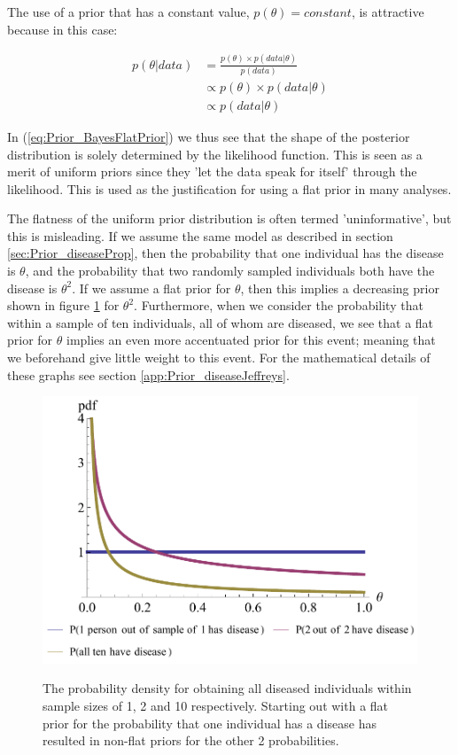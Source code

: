 \documentclass[11pt,fullpage]{book}
\begin{document}
The use of a prior that has a constant value, $p(\theta)=constant$, is attractive because in this case:

\begin{align}\label{eq:Prior_BayesFlatPrior}
p(\theta|data) &= \frac{p(\theta)\times p(data|\theta)}{p(data)}\\
& \propto p(\theta)\times p(data|\theta)\\
& \propto p(data|\theta)
\end{align}

In (\ref{eq:Prior_BayesFlatPrior}) we thus see that the shape of the posterior distribution is solely determined by the likelihood function. This is seen as a merit of uniform priors since they 'let the data speak for itself' through the likelihood. This is used as the justification for using a flat prior in many analyses.

The flatness of the uniform prior distribution is often termed 'uninformative', but this is misleading. If we assume the same model as described in section \ref{sec:Prior_diseaseProp}, then the probability that one individual has the disease is $\theta$, and the probability that two randomly sampled individuals both have the disease is $\theta^2$. If we assume a flat prior for $\theta$, then this implies a decreasing prior shown in figure \ref{fig:Prior_jeffreysIntro} for $\theta^2$. Furthermore, when we consider the probability that within a sample of ten individuals, all of whom are diseased, we see that a flat prior for $\theta$ implies an even more accentuated prior for this event; meaning that we beforehand give little weight to this event. For the mathematical details of these graphs see section \ref{app:Prior_diseaseJeffreys}.

\begin{figure}
\centering
\scalebox{0.75} 
{\includegraphics{Prior_jeffreysIntro.pdf}}\caption{The probability density for obtaining all diseased individuals within sample sizes of 1, 2 and 10 respectively. Starting out with a flat prior for the probability that one individual has a disease has resulted in non-flat priors for the other 2 probabilities.}\label{fig:Prior_jeffreysIntro}
\end{figure}
\end{document}

